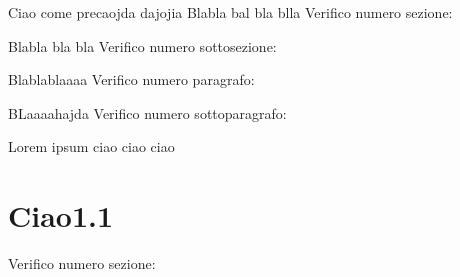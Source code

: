 \documentclass[class=miaclasse, crop=false]{standalone}
\begin{document}
	
 Ciao come precaojda
  dajojia
  Blabla bal bla blla
  Verifico numero sezione: \thesection
  
  Blabla  bla bla
  Verifico numero sottosezione: \thesubsection
  
  Blablablaaaa
  Verifico numero paragrafo: \theparagraph
  
  BLaaaahajda
  Verifico numero sottoparagrafo: \thesubparagraph
  
  
  Lorem ipsum ciao ciao ciao
  
  \section{Ciao1.1}
  Verifico numero sezione: \thesection
  
\end{document}

